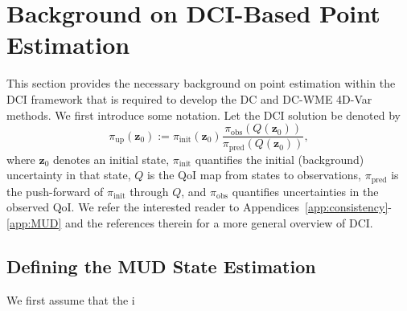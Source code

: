 \documentclass[final,1p,times]{elsarticle}
\begin{document}
\section{Background on DCI-Based Point Estimation}\label{sec:Background}

This section provides the necessary background on point estimation within the DCI framework that is required to develop the DC and DC-WME 4D-Var methods.
We first introduce some notation.
Let the DCI solution be denoted by 
\begin{equation}
        \pi_{\mathrm{up}} \left(\mathbf{z}_{0}\right) := \pi_{\mathrm{init}} \left(\mathbf{z}_{0}\right) \frac{\pi_{\mathrm{obs}}\left( Q\left(\mathbf{z}_{0}\right) \right) }{\pi_{\mathrm{pred}} \left( Q \left(\mathbf{z}_{0}\right) \right)}, \label{eq:dci_problem1}
\end{equation}
where $\mathbf{z}_0$ denotes an initial state, $\pi_{\mathrm{init}}$ quantifies the initial (background) uncertainty in that state, $Q$ is the QoI map from states to observations, $\pi_{\mathrm{pred}}$ is the push-forward of $\pi_{\mathrm{init}}$ through $Q$, and $\pi_{\mathrm{obs}}$ quantifies uncertainties in the observed QoI. 
We refer the interested reader to Appendices~\ref{app:consistency}-\ref{app:MUD} and the references therein for a more general overview of DCI.


\subsection{Defining the MUD State Estimation}\label{subsec:mud_state_estimate}

We first assume that the i
\end{document}
